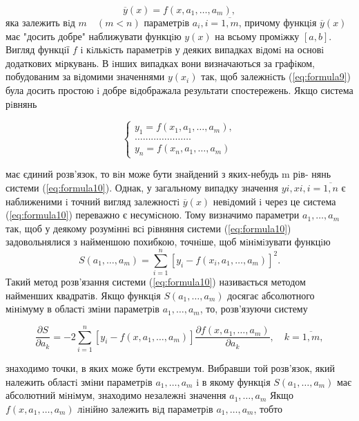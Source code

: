 \documentclass[ukrainian,14pt]{extarticle}
\begin{document}
\begin{equation}\label{eq:formula9}
    \overline{y}(x) = f(x, a_1, \ldots , a_m),
\end{equation}
яка залежить вiд $m \quad(m < n)$ параметрiв $a_i, i = \overline{1, m}$, причому функцiя
$\overline{y}(x)$ має "досить добре"    наближувати функцiю $y(x)$ на всьому промiжку
$[a, b]$. Вигляд функцiї $f$ i кiлькiсть параметрiв у деяких випадках
вiдомi на основi додаткових мiркувань. В iнших випадках вони визначаються за графiком,
 побудованим за вiдомими значеннями $y(x_i)$ так,
щоб залежнiсть (\ref{eq:formula9}) була досить простою i добре вiдображала результати спостережень.
Якщо система рiвнянь

\begin{equation}\label{eq:formula10}
\begin{cases}
    y_1 = f(x_1, a_1, \ldots , a_m), \\
	\ldots \ldots \ldots \ldots  \ldots \ldots \ldots\\
y_n = f(x_n, a_1, \ldots , a_m)
\end{cases}
\end{equation}

має єдиний розв’язок, то вiн може бути знайдений з яких-небудь m рiв-
нянь системи (\ref{eq:formula10}). Однак, у загальному випадку значення $yi, xi, i = \overline{1, n}$
є наближеними i точний вигляд залежностi $\overline{y}(x)$ невiдомий i через
це система (\ref{eq:formula10}) переважно є несумiсною. Тому визначимо параметри
$a_1, \ldots , a_m $ так, щоб у деякому розумiннi всi рiвняння системи (\ref{eq:formula10}) задовольнялися
 з найменшою похибкою, точнiше, щоб мiнiмiзувати функцiю
$$
 S(a_1, \ldots , a_m) = \sum_{i=1}^n [y_i - f (x_i, a_1, \ldots , a_m)]^2.
$$
Такий метод розв'язання системи (\ref{eq:formula10}) називається методом найменших квадратiв.
Якщо функцiя  $S(a_1, \ldots , a_m)$ досягає абсолютного мiнiмуму в областi змiни 
параметрiв $a_1, \ldots , a_m$, то, розв'язуючи систему

$$
    \frac{\partial S}{\partial a_k} = -2 \sum_{i=1}^n [y_i - f(x, a_1, \ldots , a_m)] 
     \frac{\partial f(x, a_1, \ldots , a_m)}{\partial a_k}, \quad k = \overline{1,m},
$$

знаходимо точки, в яких може бути екстремум. Вибравши той розв'язок, 
який належить областi змiни параметрiв $a_1, \ldots , a_m$ i в якому функцiя
$S(a_1, \ldots , a_m)$ має абсолютний мiнiмум, знаходимо незалежнi значення
 $a_1, \ldots , a_m$
Якщо $f(x, a_1, \ldots , a_m)$ лiнiйно залежить вiд параметрiв $a_1, \ldots , a_m$, тобто
\end{document}
